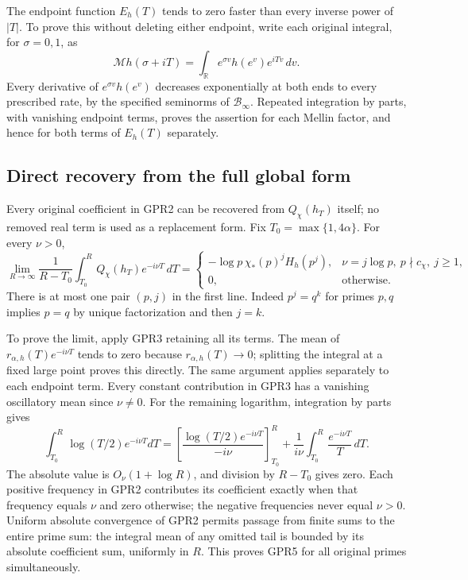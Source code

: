The endpoint function $E_h(T)$ tends to zero faster than every
inverse power of $|T|$. To prove this without deleting either
endpoint, write each original integral, for $\sigma=0,1$, as
\[
 \mathcal Mh(\sigma+iT)=
 \int_{\mathbb R}e^{\sigma v}h(e^v)e^{iTv}\,dv.
\]
Every derivative of $e^{\sigma v}h(e^v)$ decreases
exponentially at both ends to every prescribed rate, by the
specified seminorms of $\mathcal B_\infty$.
Repeated integration by parts, with vanishing endpoint terms,
proves the assertion for each Mellin factor, and hence for
both terms of $E_h(T)$ separately.

\subsection{Direct recovery from the full global form}

Every original coefficient in GPR2 can be recovered from
$Q_\chi(h_T)$ itself; no removed real term is used as a
replacement form. Fix $T_0=\max\{1,4\alpha\}$. For every
$\nu>0$,
\begin{equation}\tag{GPR5}
 \lim_{R\to\infty}\frac1{R-T_0}
 \int_{T_0}^{R}Q_\chi(h_T)e^{-i\nu T}\,dT
 =
 \begin{cases}
  -\log p\,\chi_*(p)^jH_h(p^j),
       &\nu=j\log p,\ p\nmid c_\chi,\ j\ge1,\\
  0,&\text{otherwise}.
 \end{cases}
\end{equation}
There is at most one pair $(p,j)$ in the first line.
Indeed $p^j=q^k$ for primes $p,q$ implies $p=q$ by unique
factorization and then $j=k$.

To prove the limit, apply GPR3 retaining all its terms.
The mean of $r_{\alpha,h}(T)e^{-i\nu T}$ tends to zero
because $r_{\alpha,h}(T)\to0$; splitting the integral at a
fixed large point proves this directly.
The same argument applies separately to each endpoint term.
Every constant contribution in GPR3 has a vanishing oscillatory
mean since $\nu\ne0$.
For the remaining logarithm, integration by parts gives
\[
 \int_{T_0}^R\log(T/2)e^{-i\nu T}dT
 =
 \left[\frac{\log(T/2)e^{-i\nu T}}{-i\nu}\right]_{T_0}^R
 +\frac1{i\nu}\int_{T_0}^R\frac{e^{-i\nu T}}T\,dT.
\]
The absolute value is $O_\nu(1+\log R)$, and division by
$R-T_0$ gives zero.
Each positive frequency in GPR2 contributes its coefficient
exactly when that frequency equals $\nu$ and zero otherwise;
the negative frequencies never equal $\nu>0$.
Uniform absolute convergence of GPR2 permits passage from
finite sums to the entire prime sum: the integral mean of
any omitted tail is bounded by its absolute coefficient
sum, uniformly in $R$. This proves GPR5 for all original
primes simultaneously.

